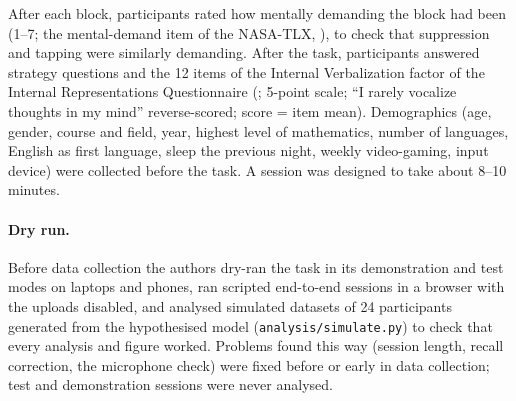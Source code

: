\documentclass[11pt,a4paper]{article}
\begin{document}
After each block, participants
rated how mentally demanding the block had been (1--7; the mental-demand item of the NASA-TLX,
\citealp{hart1988development}), to check that suppression and tapping were similarly demanding. After the task, participants
answered strategy questions and the 12 items of the Internal Verbalization factor of the Internal Representations Questionnaire
(\citealp{roebuck2020internal}; 5-point scale; ``I rarely vocalize thoughts in my mind'' reverse-scored; score = item mean). Demographics (age,
gender, course and field, year, highest level of mathematics, number of languages, English as first language, sleep the previous
night, weekly video-gaming, input device) were collected before the task. A session was designed to take about 8--10 minutes.

\paragraph{Dry run.} Before data collection the authors dry-ran the task in its demonstration and test modes on laptops and
phones, ran scripted end-to-end sessions in a browser with the uploads disabled, and analysed simulated datasets of 24
participants generated from the hypothesised model (\texttt{analysis/simulate.py}) to check that every analysis and figure
worked. Problems found this way (session length, recall correction, the microphone check) were fixed before or early in data
collection; test and demonstration sessions were never analysed.
\end{document}

